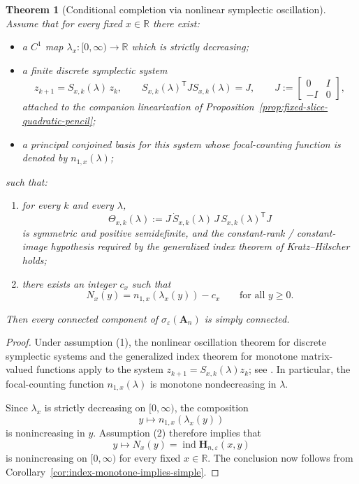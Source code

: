 \documentclass[11pt]{article}
\newtheorem{theorem}{Theorem}[section]
\DeclareMathOperator{\ind}{ind}
\begin{document}
\begin{theorem}[Conditional completion via nonlinear symplectic oscillation]
\label{thm:conditional-completion}
Assume that for every fixed \(x\in\mathbb R\) there exist:

\begin{itemize}
\item a \(C^1\) map \(\lambda_x:[0,\infty)\to\mathbb R\) which is strictly decreasing;

\item a finite discrete symplectic system
\[
z_{k+1}=S_{x,k}(\lambda)\,z_k,
\qquad
S_{x,k}(\lambda)^{\mathsf T} J S_{x,k}(\lambda)=J,
\qquad
J:=
\begin{bmatrix}
0&I\\
-I&0
\end{bmatrix},
\]
attached to the companion linearization of Proposition~\ref{prop:fixed-slice-quadratic-pencil};

\item a principal conjoined basis for this system whose focal-counting function is denoted
by \(n_{1,x}(\lambda)\);
\end{itemize}
such that:

\begin{enumerate}
\item for every \(k\) and every \(\lambda\),
\[
\Theta_{x,k}(\lambda)
:=
J\,\dot S_{x,k}(\lambda)\,J\,S_{x,k}(\lambda)^{\mathsf T}J
\]
is symmetric and positive semidefinite, and the constant-rank / constant-image hypothesis
required by the generalized index theorem of Kratz--Hilscher holds;

\item there exists an integer \(c_x\) such that
\[
N_x(y)=n_{1,x}(\lambda_x(y)) - c_x
\qquad \text{for all } y\ge 0.
\]
\end{enumerate}

Then every connected component of \(\sigma_\varepsilon(\mathbf A_n)\) is simply connected.
\end{theorem}

\begin{proof}
Under assumption (1), the nonlinear oscillation theorem for discrete symplectic systems and the
generalized index theorem for monotone matrix-valued functions apply to the system
\(z_{k+1}=S_{x,k}(\lambda)z_k\); see \cite{Hilscher2012,KratzHilscher2013}. In particular, the
focal-counting function \(n_{1,x}(\lambda)\) is monotone nondecreasing in \(\lambda\).

Since \(\lambda_x\) is strictly decreasing on \([0,\infty)\), the composition
\[
y\longmapsto n_{1,x}(\lambda_x(y))
\]
is nonincreasing in \(y\). Assumption (2) therefore implies that
\[
y\longmapsto N_x(y)=\ind \mathbf H_{n,\varepsilon}(x,y)
\]
is nonincreasing on \([0,\infty)\) for every fixed \(x\in\mathbb R\). The conclusion now follows
from Corollary~\ref{cor:index-monotone-implies-simple}.
\end{proof}
\end{document}
